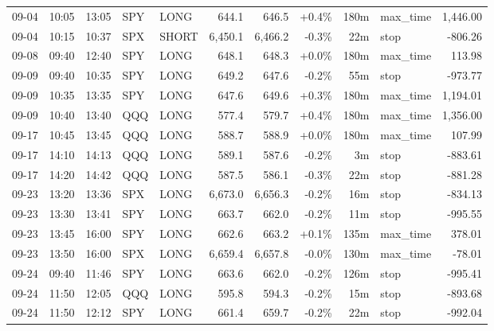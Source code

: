 \documentclass[11pt,a4paper,twoside]{article}
\begin{document}
\begin{center}
\begin{longtable}{>{\color{txtmain}}l l l l l r r r r >{\color{txtmain}}l r}
09-04 & 10:05 & 13:05 & SPY & LONG & 644.1 & 646.5 & \textcolor{wingreen}{+0.4\%} & 180m & max\_time & \textcolor{wingreen}{1,446.00} \\
09-04 & 10:15 & 10:37 & SPX & SHORT & 6,450.1 & 6,466.2 & \textcolor{lossred}{-0.3\%} & 22m & stop & \textcolor{lossred}{-806.26} \\
09-08 & 09:40 & 12:40 & SPY & LONG & 648.1 & 648.3 & \textcolor{wingreen}{+0.0\%} & 180m & max\_time & \textcolor{wingreen}{113.98} \\
09-09 & 09:40 & 10:35 & SPY & LONG & 649.2 & 647.6 & \textcolor{lossred}{-0.2\%} & 55m & stop & \textcolor{lossred}{-973.77} \\
09-09 & 10:35 & 13:35 & SPY & LONG & 647.6 & 649.6 & \textcolor{wingreen}{+0.3\%} & 180m & max\_time & \textcolor{wingreen}{1,194.01} \\
09-09 & 10:40 & 13:40 & QQQ & LONG & 577.4 & 579.7 & \textcolor{wingreen}{+0.4\%} & 180m & max\_time & \textcolor{wingreen}{1,356.00} \\
09-17 & 10:45 & 13:45 & QQQ & LONG & 588.7 & 588.9 & \textcolor{wingreen}{+0.0\%} & 180m & max\_time & \textcolor{wingreen}{107.99} \\
09-17 & 14:10 & 14:13 & QQQ & LONG & 589.1 & 587.6 & \textcolor{lossred}{-0.2\%} & 3m & stop & \textcolor{lossred}{-883.61} \\
09-17 & 14:20 & 14:42 & QQQ & LONG & 587.5 & 586.1 & \textcolor{lossred}{-0.3\%} & 22m & stop & \textcolor{lossred}{-881.28} \\
09-23 & 13:20 & 13:36 & SPX & LONG & 6,673.0 & 6,656.3 & \textcolor{lossred}{-0.2\%} & 16m & stop & \textcolor{lossred}{-834.13} \\
09-23 & 13:30 & 13:41 & SPY & LONG & 663.7 & 662.0 & \textcolor{lossred}{-0.2\%} & 11m & stop & \textcolor{lossred}{-995.55} \\
09-23 & 13:45 & 16:00 & SPY & LONG & 662.6 & 663.2 & \textcolor{wingreen}{+0.1\%} & 135m & max\_time & \textcolor{wingreen}{378.01} \\
09-23 & 13:50 & 16:00 & SPX & LONG & 6,659.4 & 6,657.8 & \textcolor{lossred}{-0.0\%} & 130m & max\_time & \textcolor{lossred}{-78.01} \\
09-24 & 09:40 & 11:46 & SPY & LONG & 663.6 & 662.0 & \textcolor{lossred}{-0.2\%} & 126m & stop & \textcolor{lossred}{-995.41} \\
09-24 & 11:50 & 12:05 & QQQ & LONG & 595.8 & 594.3 & \textcolor{lossred}{-0.2\%} & 15m & stop & \textcolor{lossred}{-893.68} \\
09-24 & 11:50 & 12:12 & SPY & LONG & 661.4 & 659.7 & \textcolor{lossred}{-0.2\%} & 22m & stop & \textcolor{lossred}{-992.04} \\

\end{longtable}
\end{center}
\end{document}
